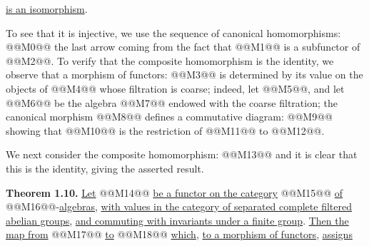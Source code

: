 \uline{is an isomorphism}.

To see that it is injective, we use the sequence of canonical homomorphisms:
@@M0@@
the last arrow coming from the fact that @@M1@@ is a subfunctor of @@M2@@. To verify that the composite homomorphism is the identity, we observe that a morphism of functors: @@M3@@ is determined by its value on the objects of @@M4@@ whose filtration is coarse; indeed, let @@M5@@, and let @@M6@@ be the algebra @@M7@@ endowed with the coarse filtration; the canonical morphism @@M8@@ defines a commutative diagram:
@@M9@@
showing that @@M10@@ is the restriction of @@M11@@ to @@M12@@.

We next consider the composite homomorphism:
@@M13@@
and it is clear that this is the identity, giving the asserted result.

\textbf{Theorem 1.10.} \uline{Let} @@M14@@ \uline{be a functor on the category} @@M15@@ \uline{of} @@M16@@-\uline{algebras}, \uline{with values in the category of separated complete filtered abelian groups}, \uline{and commuting with invariants under a finite group}. \uline{Then the map from} @@M17@@ \uline{to} @@M18@@ \uline{which}, \uline{to a morphism of functors}, \uline{assigns}

